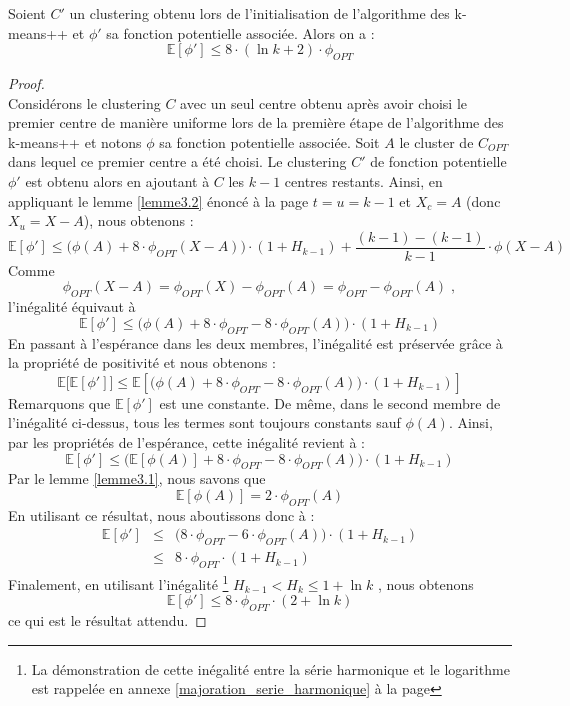 \documentclass[12pt,a4paper]{book}
\newcommand{\E}{\mathbb{E}}
\newcommand{\1}{\mathds{1}}
\begin{document}
	\begin{theorem}\label{theoreme3.1}
		Soient $C'$ un clustering obtenu lors de l'initialisation de l'algorithme des k-means++ et $\phi'$ sa fonction potentielle associée.
		Alors on a :
		$$
			\E[\phi'] \leq 8 \cdot \left(\ln k + 2 \right) \cdot \phi_{OPT}
		$$ 
	\end{theorem}
	
	\begin{proof}
		~\\
		Considérons le clustering $C$ avec un seul centre obtenu après avoir choisi le premier centre de manière uniforme lors de la première étape de l'algorithme des k-means++ et notons $\phi$ sa fonction potentielle associée. Soit $A$ le cluster de $C_{OPT}$ dans lequel ce premier centre a été choisi. Le clustering $C'$ de fonction potentielle $\phi'$ est obtenu alors en ajoutant à $C$ les $k-1$ centres restants. Ainsi, en appliquant le lemme \ref{lemme3.2} énoncé à la page \pageref{lemme3.2} $t=u=k-1$ et $X_c=A$ (donc $X_u=X-A$), nous obtenons :
		$$
			\E[\phi'] \leq \bigg( \phi \left( A \right) + 8 \cdot \phi_{OPT} \left( X-A \right) \bigg) \cdot \left( 1 + H_{k-1} \right) + \frac{(k-1)-(k-1)}{k-1} \cdot \phi \left( X-A \right)
		$$
		Comme $$\phi_{OPT} \left( X-A \right) = \phi_{OPT} \left( X \right) - \phi_{OPT}\left( A \right) = \phi_{OPT} - \phi_{OPT}\left( A \right) \; ,$$ l'inégalité équivaut à
		$$
			\E[\phi'] \leq \bigg( \phi \left( A \right) + 8 \cdot \phi_{OPT} - 8 \cdot \phi_{OPT} \left( A \right) \bigg) \cdot \left( 1 + H_{k-1} \right)
		$$
		En passant à l'espérance dans les deux membres, l'inégalité est préservée grâce à la propriété de positivité et nous obtenons :
		$$
			\E\bigg[\E[\phi']\bigg] \leq \E \left[\bigg( \phi \left( A \right) + 8 \cdot \phi_{OPT} - 8 \cdot \phi_{OPT} \left( A \right) \bigg) \cdot \left( 1 + H_{k-1} \right)\right]
		$$
		Remarquons que $\E[\phi']$ est une constante. De même, dans le second membre de l'inégalité ci-dessus, tous les termes sont toujours constants sauf $\phi(A)$. Ainsi, par les propriétés de l'espérance, cette inégalité revient à :
		$$
			\E[\phi'] \leq \bigg( \E\left[ \phi \left( A \right)\right] + 8 \cdot \phi_{OPT} - 8 \cdot \phi_{OPT} \left( A \right) \bigg) \cdot \left( 1 + H_{k-1} \right)
		$$
		Par le lemme \ref{lemme3.1}, nous savons que
		$$
			\E\left[\phi(A)\right] = 2 \cdot \phi_{OPT} \left( A \right)
		$$
		 En utilisant ce résultat, nous aboutissons donc à :
		 \begin{eqnarray*}
		 	\E[\phi'] &\leq & \bigg(8 \cdot \phi_{OPT} - 6 \cdot \phi_{OPT} \left( A \right) \bigg) \cdot \left( 1 + H_{k-1} \right) \\
		 	& \leq & 8 \cdot \phi_{OPT}\cdot \left( 1 + H_{k-1} \right)
		 \end{eqnarray*}
		 Finalement, en utilisant l'inégalité \footnote{La démonstration de cette inégalité entre la série harmonique et le logarithme est rappelée en annexe \ref{majoration_serie_harmonique} à la page \pageref{majoration_serie_harmonique}} $H_{k-1} < H_k \leq 1 + \ln k$ , nous obtenons 
		 $$
		 	\E[\phi'] \leq  8 \cdot \phi_{OPT}\cdot \left( 2 + \ln k \right)
		 $$
		 ce qui est le résultat attendu.
	\end{proof}
\end{document}
